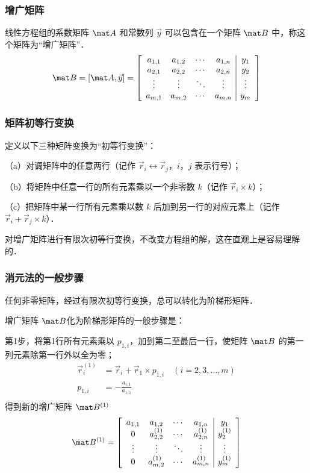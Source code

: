 \subsubsection{增广矩阵}
线性方程组的系数矩阵 $\mat A$ 和常数列 $\vec y$ 可以包含在一个矩阵 $\mat B$ 中，称这个矩阵为“增广矩阵”．
\begin{equation}
\mat B=[\mat A ,\vec y]={
	\left[ \begin{array}{cccc|c}
	a_{1,1} &a_{1,2} &\cdots &a_{1,n} &y_1 \\
	a_{2,1} &a_{2,2} &\cdots &a_{2,n} &y_2 \\
	\vdots  &\vdots  &\ddots &\vdots  &\vdots \\
	a_{m,1} &a_{m,2} &\cdots &a_{m,n} &y_m \\
	\end{array} 
	\right ]}
\end{equation}

\subsubsection{矩阵初等行变换}
定义以下三种矩阵变换为“初等行变换”：

（a）对调矩阵中的任意两行（记作 $\vec r_i \leftrightarrow \vec r_j$，$i$，$j$ 表示行号）；

（b）将矩阵中任意一行的所有元素乘以一个非零数 $k$（记作 $\vec r_i \times k$）；

（c）把矩阵中某一行所有元素乘以数 $k$ 后加到另一行的对应元素上（记作 $\vec r_i + \vec r_j \times k$）．

对增广矩阵进行有限次初等行变换，不改变方程组的解，这在直观上是容易理解的．

\subsubsection{消元法的一般步骤}
任何非零矩阵，经过有限次初等行变换，总可以转化为阶梯形矩阵．

增广矩阵 $\mat B$化为阶梯形矩阵的一般步骤是：

第1步，将第1行所有元素乘以 $p_{1,i}$，加到第二至最后一行，使矩阵 $\mat B$ 的第一列元素除第一行外以全为零；
\begin{equation}\begin{aligned}
\vec r_i^{(1)} &= \vec r_i + \vec r_1 \times p_{1,i} \quad (i=2,3,\dots,m) \\
p_{1,i} &= - \frac{a_{i,1}}{a_{1,1}} \\
\end{aligned}\end{equation}
得到新的增广矩阵 $\mat B^{(1)}$
\begin{equation}
\mat B^{(1)}={
	\left[ \begin{array}{cccc|c}
	a_{1,1} &a_{1,2}       &\cdots &a_{1,n}       &y_1 \\
	0       &a_{2,2}^{(1)} &\cdots &a_{2,n}^{(1)} &y_2^{(1)} \\
	\vdots  &\vdots        &\ddots &\vdots        &\vdots \\
	0       &a_{m,2}^{(1)} &\cdots &a_{m,n}^{(1)} &y_m^{(1)} \\
	\end{array} 
	\right ]}
\end{equation}


